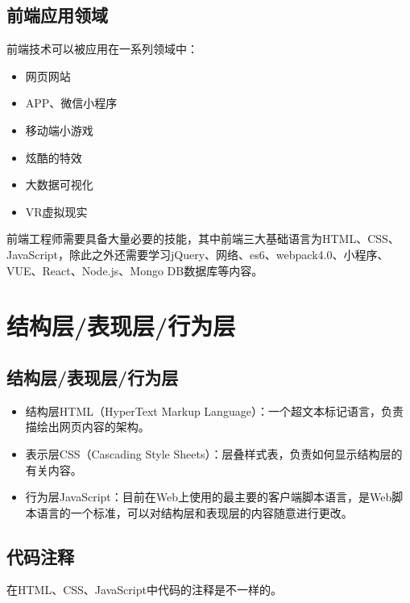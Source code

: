 \subsection{前端应用领域}

前端技术可以被应用在一系列领域中：

\begin{itemize}
	\item 网页网站
	\item APP、微信小程序
	\item 移动端小游戏
	\item 炫酷的特效
	\item 大数据可视化
	\item VR虚拟现实
\end{itemize}

前端工程师需要具备大量必要的技能，其中前端三大基础语言为HTML、CSS、JavaScript，除此之外还需要学习jQuery、网络、es6、webpack4.0、小程序、VUE、React、Node.js、Mongo DB数据库等内容。\\

\newpage

\section{结构层/表现层/行为层}

\subsection{结构层/表现层/行为层}

\begin{itemize}
	\item 结构层HTML（HyperText Markup Language）：一个超文本标记语言，负责描绘出网页内容的架构。

	\item 表示层CSS（Cascading Style Sheets）：层叠样式表，负责如何显示结构层的有关内容。

	\item 行为层JavaScript：目前在Web上使用的最主要的客户端脚本语言，是Web脚本语言的一个标准，可以对结构层和表现层的内容随意进行更改。
\end{itemize}

\vspace{0.5cm}

\subsection{代码注释}

在HTML、CSS、JavaScript中代码的注释是不一样的。

